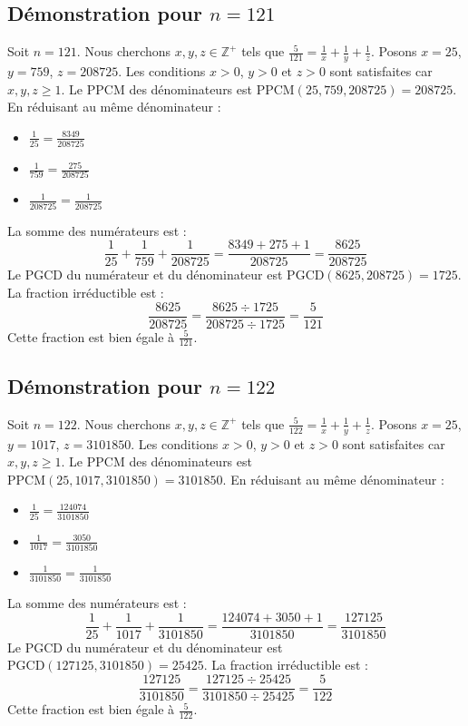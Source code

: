 \documentclass[11pt,a4paper]{article}
\begin{document}
\subsection{Démonstration pour $n = 121$}
Soit $n = 121$. Nous cherchons $x, y, z \in \mathbb{Z}^{+}$ tels que $\frac{5}{121} = \frac{1}{x} + \frac{1}{y} + \frac{1}{z}$.
Posons $x = 25$, $y = 759$, $z = 208725$.
Les conditions $x > 0$, $y > 0$ et $z > 0$ sont satisfaites car $x, y, z \geq 1$.
Le PPCM des dénominateurs est $\text{PPCM}(25, 759, 208725) = 208725$.
En réduisant au même dénominateur :
\begin{itemize}
    \item $\frac{1}{25} = \frac{8349}{208725}$
    \item $\frac{1}{759} = \frac{275}{208725}$
    \item $\frac{1}{208725} = \frac{1}{208725}$
\end{itemize}
La somme des numérateurs est :
$$ \frac{1}{25} + \frac{1}{759} + \frac{1}{208725} = \frac{8349 + 275 + 1}{208725} = \frac{8625}{208725} $$
Le PGCD du numérateur et du dénominateur est $\text{PGCD}(8625, 208725) = 1725$.
La fraction irréductible est :
$$ \frac{8625}{208725} = \frac{8625 \div 1725}{208725 \div 1725} = \frac{5}{121} $$
Cette fraction est bien égale à $\frac{5}{121}$.

\subsection{Démonstration pour $n = 122$}
Soit $n = 122$. Nous cherchons $x, y, z \in \mathbb{Z}^{+}$ tels que $\frac{5}{122} = \frac{1}{x} + \frac{1}{y} + \frac{1}{z}$.
Posons $x = 25$, $y = 1017$, $z = 3101850$.
Les conditions $x > 0$, $y > 0$ et $z > 0$ sont satisfaites car $x, y, z \geq 1$.
Le PPCM des dénominateurs est $\text{PPCM}(25, 1017, 3101850) = 3101850$.
En réduisant au même dénominateur :
\begin{itemize}
    \item $\frac{1}{25} = \frac{124074}{3101850}$
    \item $\frac{1}{1017} = \frac{3050}{3101850}$
    \item $\frac{1}{3101850} = \frac{1}{3101850}$
\end{itemize}
La somme des numérateurs est :
$$ \frac{1}{25} + \frac{1}{1017} + \frac{1}{3101850} = \frac{124074 + 3050 + 1}{3101850} = \frac{127125}{3101850} $$
Le PGCD du numérateur et du dénominateur est $\text{PGCD}(127125, 3101850) = 25425$.
La fraction irréductible est :
$$ \frac{127125}{3101850} = \frac{127125 \div 25425}{3101850 \div 25425} = \frac{5}{122} $$
Cette fraction est bien égale à $\frac{5}{122}$.
\end{document}
